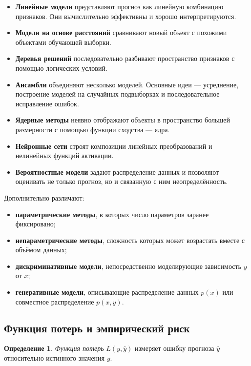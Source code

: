 \documentclass[12pt,a4paper]{article}
\theoremstyle{definition}
\newtheorem{definition}[theorem]{Определение}
\theoremstyle{remark}
\begin{document}
\begin{itemize}
    \item \textbf{Линейные модели} представляют прогноз как линейную комбинацию
          признаков. Они вычислительно эффективны и хорошо интерпретируются.
    \item \textbf{Модели на основе расстояний} сравнивают новый объект
          с похожими объектами обучающей выборки.
    \item \textbf{Деревья решений} последовательно разбивают пространство
          признаков с помощью логических условий.
    \item \textbf{Ансамбли} объединяют несколько моделей. Основные идеи ---
          усреднение, построение моделей на случайных подвыборках и
          последовательное исправление ошибок.
    \item \textbf{Ядерные методы} неявно отображают объекты в пространство
          большей размерности с помощью функции сходства --- ядра.
    \item \textbf{Нейронные сети} строят композиции линейных преобразований
          и нелинейных функций активации.
    \item \textbf{Вероятностные модели} задают распределение данных и позволяют
          оценивать не только прогноз, но и связанную с ним неопределённость.
\end{itemize}

Дополнительно различают:

\begin{itemize}
    \item \textbf{параметрические методы}, в которых число параметров заранее
          фиксировано;
    \item \textbf{непараметрические методы}, сложность которых может возрастать
          вместе с объёмом данных;
    \item \textbf{дискриминативные модели}, непосредственно моделирующие
          зависимость $y$ от $x$;
    \item \textbf{генеративные модели}, описывающие распределение данных
          $p(x)$ или совместное распределение $p(x,y)$.
\end{itemize}

\subsection{Функция потерь и эмпирический риск}

\begin{definition}
\emph{Функция потерь} $L(y,\widehat y)$ измеряет ошибку прогноза
$\widehat y$ относительно истинного значения $y$.
\end{definition}
\end{document}
